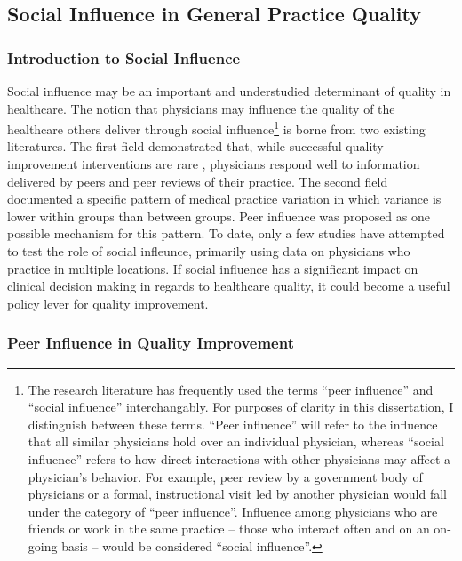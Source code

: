 \documentclass[12pt]{article}
\begin{document}
\subsection{Social Influence in General Practice Quality}

\subsubsection{Introduction to Social Influence}

Social influence may be an important and understudied determinant of quality in healthcare. The notion that physicians may influence the quality of the healthcare others deliver through social influence\footnote{The research literature has frequently used the terms ``peer influence'' and ``social influence'' interchangably. For purposes of clarity in this dissertation, I distinguish between these terms. ``Peer influence'' will refer to the influence that all similar physicians hold over an individual physician, whereas ``social influence'' refers to how direct interactions with other physicians may affect a physician's behavior. For example, peer review by a government body of physicians or a formal, instructional visit led by another physician would fall under the category of ``peer influence''. Influence among physicians who are friends or work in the same practice -- those who interact often and on an on-going basis -- would be considered ``social influence''.} is borne from two existing literatures. The first field demonstrated that, while successful quality improvement interventions are rare \citep{conry10Year20002012}, physicians respond well to information delivered by peers and peer reviews of their practice. The second field documented a specific pattern of medical practice variation in which variance is lower within groups than between groups. Peer influence was proposed as one possible mechanism for this pattern. To date, only a few studies have attempted to test the role of social infleunce, primarily using data on physicians who practice in multiple locations. If social influence has a significant impact on clinical decision making in regards to healthcare quality, it could become a useful policy lever for quality improvement.

\subsubsection{Peer Influence in Quality Improvement}
\end{document}
